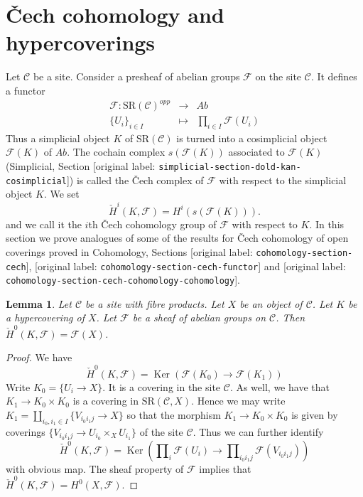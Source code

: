 \documentclass[10pt,a4paper]{article}
\theoremstyle{plain}
\newtheorem{lemma}[subsection]{Lemma}
\theoremstyle{definition}
\theoremstyle{remark}
\numberwithin{equation}{subsection}
\def\Ker{\mathop{\mathrm{Ker}}}
\begin{document}
\section{{\v C}ech cohomology and hypercoverings}
\label{section-hyper-cech}

\noindent
Let $\mathcal{C}$ be a site. Consider a presheaf of
abelian groups $\mathcal{F}$ on the site $\mathcal{C}$.
It defines a functor
\begin{eqnarray*}
\mathcal{F} : \text{SR}(\mathcal{C})^{opp}
& \longrightarrow &
\textit{Ab} \\
\{U_i\}_{i \in I} &
\longmapsto &
\prod\nolimits_{i \in I} \mathcal{F}(U_i)
\end{eqnarray*}
Thus a simplicial object $K$ of $\text{SR}(\mathcal{C})$
is turned into a cosimplicial object $\mathcal{F}(K)$ of $\textit{Ab}$.
The cochain complex $s(\mathcal{F}(K))$ associated to $\mathcal{F}(K)$
(Simplicial, Section
\textnormal{[original label: \nolinkurl{simplicial-section-dold-kan-cosimplicial}]})
is called the {\v C}ech complex of $\mathcal{F}$ with
respect to the simplicial object $K$. We set
$$
\check{H}^i(K, \mathcal{F})
=
H^i(s(\mathcal{F}(K))).
$$
and we call it the $i$th {\v C}ech cohomology group
of $\mathcal{F}$ with respect to $K$.
In this section we prove analogues of some of the results for
{\v C}ech cohomology of open coverings proved in
Cohomology, Sections \textnormal{[original label: \nolinkurl{cohomology-section-cech}]},
\textnormal{[original label: \nolinkurl{cohomology-section-cech-functor}]} and
\textnormal{[original label: \nolinkurl{cohomology-section-cech-cohomology-cohomology}]}.

\begin{lemma}
\label{lemma-h0-cech}
Let $\mathcal{C}$ be a site with fibre products.
Let $X$ be an object of $\mathcal{C}$.
Let $K$ be a hypercovering of $X$.
Let $\mathcal{F}$ be a sheaf of abelian groups on $\mathcal{C}$.
Then $\check{H}^0(K, \mathcal{F}) = \mathcal{F}(X)$.
\end{lemma}

\begin{proof}
We have
$$
\check{H}^0(K, \mathcal{F})
=
\Ker(\mathcal{F}(K_0) \longrightarrow \mathcal{F}(K_1))
$$
Write $K_0 = \{U_i \to X\}$. It is a covering in the site
$\mathcal{C}$. As well, we have that $K_1 \to K_0 \times K_0$
is a covering in $\text{SR}(\mathcal{C}, X)$. Hence we may
write $K_1 = \amalg_{i_0, i_1 \in I} \{V_{i_0i_1j} \to X\}$
so that the morphism $K_1 \to K_0 \times K_0$ is given
by coverings $\{V_{i_0i_1j} \to U_{i_0} \times_X U_{i_1}\}$
of the site $\mathcal{C}$. Thus we can further identify
$$
\check{H}^0(K, \mathcal{F})
=
\Ker(
\prod\nolimits_i \mathcal{F}(U_i)
\longrightarrow
\prod\nolimits_{i_0i_1 j} \mathcal{F}(V_{i_0i_1j})
)
$$
with obvious map. The sheaf property of $\mathcal{F}$
implies that $\check{H}^0(K, \mathcal{F}) = H^0(X, \mathcal{F})$.
\end{proof}
\end{document}
